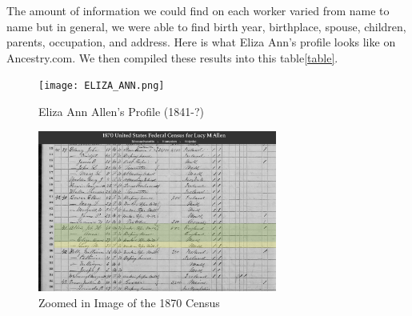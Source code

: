 \documentclass[
  letterpaper,
  DIV=11,
  numbers=noendperiod]{scrartcl}
\begin{document}
The amount of information we could find on each worker varied from name
to name but in general, we were able to find birth year, birthplace,
spouse, children, parents, occupation, and address. Here is what Eliza
Ann's profile looks like on Ancestry.com. We then compiled these results
into this table\ref{table}.

\begin{figure}

{\centering \texttt{[image: ELIZA\_ANN.png]}

}

\caption{\label{fig-sample12}Eliza Ann Allen's Profile (1841-?)}

\end{figure}

\begin{figure}

{\centering \includegraphics[width=0.7\textwidth,height=\textheight]{Allens family 1870 census Data.png}

}

\caption{\label{fig-sample13}Zoomed in Image of the 1870 Census}

\end{figure}
\end{document}
